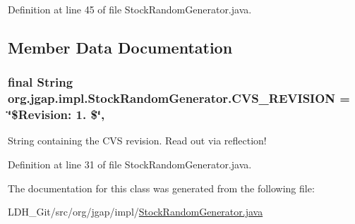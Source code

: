 Definition at line 45 of file Stock\-Random\-Generator.\-java.



\subsection{Member Data Documentation}
\hypertarget{classorg_1_1jgap_1_1impl_1_1_stock_random_generator_a3968f0c55114657f8d37a9b522f14625}{
\subsubsection[{C\-V\-S\-\_\-\-R\-E\-V\-I\-S\-I\-O\-N}]{\setlength{\rightskip}{0pt plus 5cm}final String org.\-jgap.\-impl.\-Stock\-Random\-Generator.\-C\-V\-S\-\_\-\-R\-E\-V\-I\-S\-I\-O\-N = \char`\"{}\$Revision\-: 1. \$\char`\"{}\hspace{0.3cm}{\ttfamily [static]}, {\ttfamily [private]}}}\label{classorg_1_1jgap_1_1impl_1_1_stock_random_generator_a3968f0c55114657f8d37a9b522f14625}
String containing the C\-V\-S revision. Read out via reflection! 

Definition at line 31 of file Stock\-Random\-Generator.\-java.



The documentation for this class was generated from the following file\-:\begin{DoxyCompactItemize}
\item 
L\-D\-H\-\_\-\-Git/src/org/jgap/impl/\hyperlink{_stock_random_generator_8java}{Stock\-Random\-Generator.\-java}\end{DoxyCompactItemize}

